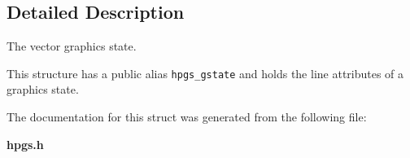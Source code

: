\subsection{Detailed Description}
The vector graphics state. 

This structure has a public alias {\tt hpgs\_\-gstate} and holds the line attributes of a graphics state. 

The documentation for this struct was generated from the following file:\begin{CompactItemize}
\item 
{\bf hpgs.h}\end{CompactItemize}
